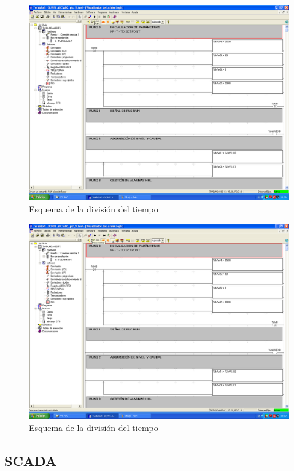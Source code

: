 \begin{figure}[ht!]
	\centering
	\includegraphics[scale=0.3]{Anexos/images/twidosoftrun.PNG}
	\caption{Esquema de la división del tiempo}
	\label{img:twidosoftrun}
\end{figure}

\begin{figure}[ht!]
	\centering
	\includegraphics[scale=0.3]{Anexos/images/twidosoftdesc.PNG}
	\caption{Esquema de la división del tiempo}
	\label{img:twidosoftdesc}
\end{figure}

\subsection{SCADA}
